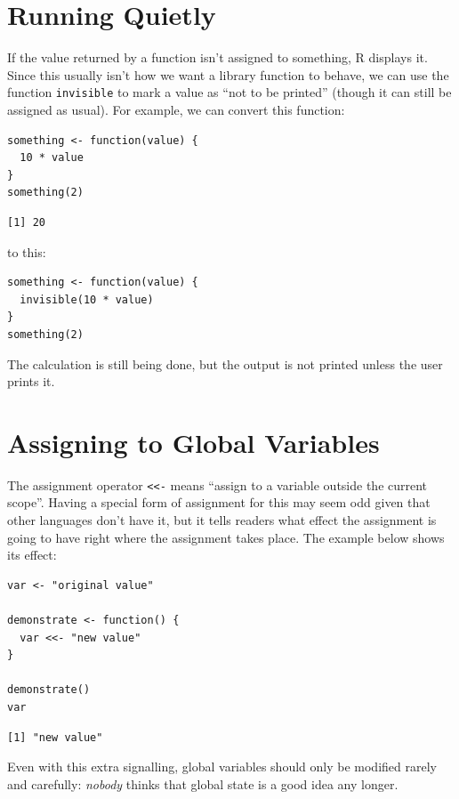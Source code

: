 \section{Running Quietly}

If the value returned by a function isn't assigned to something,
R displays it.
Since this usually isn't how we want a library function to behave,
we can use the function \texttt{invisible} to mark a value as ``not to be printed''
(though it can still be assigned as usual).
For example,
we can convert this function:

\begin{lstlisting}
something <- function(value) {
  10 * value
}
something(2)
\end{lstlisting}

\begin{lstlisting}
[1] 20
\end{lstlisting}

\noindent
to this:

\begin{lstlisting}
something <- function(value) {
  invisible(10 * value)
}
something(2)
\end{lstlisting}

The calculation is still being done,
but the output is not printed unless the user prints it.

\section{Assigning to Global Variables}

The assignment operator \texttt{\textless{}\textless{}-} means
``assign to a variable outside the current scope''.
Having a special form of assignment for this may seem odd
given that other languages don't have it,
but it tells readers what effect the assignment is going to have
right where the assignment takes place.
The example below shows its effect:

\begin{lstlisting}
var <- "original value"

demonstrate <- function() {
  var <<- "new value"
}

demonstrate()
var
\end{lstlisting}

\begin{lstlisting}
[1] "new value"
\end{lstlisting}

Even with this extra signalling,
global variables should only be modified rarely and carefully:
\emph{nobody} thinks that global state is a good idea any longer.

